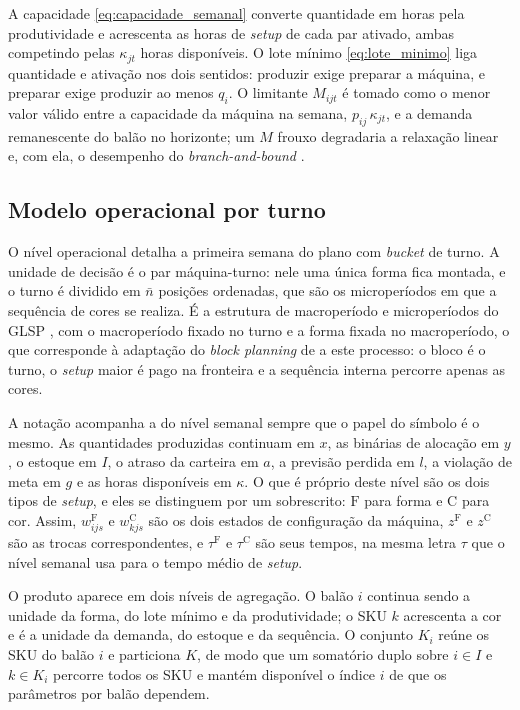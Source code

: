 \documentclass[fleqn,12pt,a4paper]{article}
\begin{document}
A capacidade \eqref{eq:capacidade_semanal} converte quantidade em horas pela produtividade e acrescenta as horas de \textit{setup} de cada par ativado, ambas competindo pelas $\kappa_{jt}$ horas disponíveis. O lote mínimo \eqref{eq:lote_minimo} liga quantidade e ativação nos dois sentidos: produzir exige preparar a máquina, e preparar exige produzir ao menos $q_i$. O limitante $M_{ijt}$ é tomado como o menor valor válido entre a capacidade da máquina na semana, $p_{ij}\,\kappa_{jt}$, e a demanda remanescente do balão no horizonte; um $M$ frouxo degradaria a relaxação linear e, com ela, o desempenho do \textit{branch-and-bound} \cite{jansdegraeve2008}.

\subsection{Modelo operacional por turno}
\label{sec:modelo_turno}

O nível operacional detalha a primeira semana do plano com \textit{bucket} de turno. A unidade de decisão é o par máquina-turno: nele uma única forma fica montada, e o turno é dividido em $\bar{n}$ posições ordenadas, que são os microperíodos em que a sequência de cores se realiza. É a estrutura de macroperíodo e microperíodos do GLSP \cite{fleischmannmeyr1997}, com o macroperíodo fixado no turno e a forma fixada no macroperíodo, o que corresponde à adaptação do \textit{block planning} de  a este processo: o bloco é o turno, o \textit{setup} maior é pago na fronteira e a sequência interna percorre apenas as cores.

A notação acompanha a do nível semanal sempre que o papel do símbolo é o mesmo. As quantidades produzidas continuam em $x$, as binárias de alocação em $y$, o estoque em $I$, o atraso da carteira em $a$, a previsão perdida em $l$, a violação de meta em $g$ e as horas disponíveis em $\kappa$. O que é próprio deste nível são os dois tipos de \textit{setup}, e eles se distinguem por um sobrescrito: $\mathrm{F}$ para forma e $\mathrm{C}$ para cor. Assim, $w^{\mathrm{F}}_{ijs}$ e $w^{\mathrm{C}}_{kjs}$ são os dois estados de configuração da máquina, $z^{\mathrm{F}}$ e $z^{\mathrm{C}}$ são as trocas correspondentes, e $\tau^{\mathrm{F}}$ e $\tau^{\mathrm{C}}$ são seus tempos, na mesma letra $\tau$ que o nível semanal usa para o tempo médio de \textit{setup}.

O produto aparece em dois níveis de agregação. O balão $i$ continua sendo a unidade da forma, do lote mínimo e da produtividade; o SKU $k$ acrescenta a cor e é a unidade da demanda, do estoque e da sequência. O conjunto $K_i$ reúne os SKU do balão $i$ e particiona $K$, de modo que um somatório duplo sobre $i \in I$ e $k \in K_i$ percorre todos os SKU e mantém disponível o índice $i$ de que os parâmetros por balão dependem.
\end{document}
